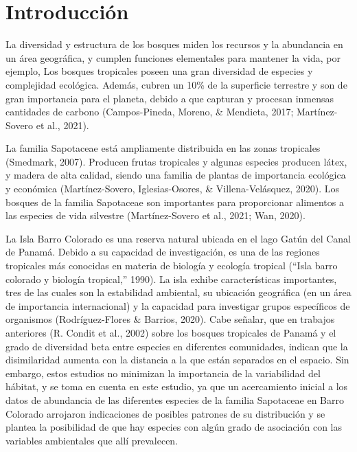 \documentclass[11pt,]{article}
\begin{document}
\vskip 6.5pt


\noindent  \section{Introducción}\label{introducciuxf3n}

La diversidad y estructura de los bosques miden los recursos y la
abundancia en un área geográfica, y cumplen funciones elementales para
mantener la vida, por ejemplo, Los bosques tropicales poseen una gran
diversidad de especies y complejidad ecológica. Además, cubren un 10\%
de la superficie terrestre y son de gran importancia para el planeta,
debido a que capturan y procesan inmensas cantidades de carbono
(Campos-Pineda, Moreno, \& Mendieta, 2017; Martínez-Sovero et al.,
2021).

La familia Sapotaceae está ampliamente distribuida en las zonas
tropicales (Smedmark, 2007). Producen frutas tropicales y algunas
especies producen látex, y madera de alta calidad, siendo una familia de
plantas de importancia ecológica y económica (Martínez-Sovero,
Iglesias-Osores, \& Villena-Velásquez, 2020). Los bosques de la familia
Sapotaceae son importantes para proporcionar alimentos a las especies de
vida silvestre (Martínez-Sovero et al., 2021; Wan, 2020).

La Isla Barro Colorado es una reserva natural ubicada en el lago Gatún
del Canal de Panamá. Debido a su capacidad de investigación, es una de
las regiones tropicales más conocidas en materia de biología y ecología
tropical (``Isla barro colorado y biología tropical,'' 1990). La isla
exhibe características importantes, tres de las cuales son la
estabilidad ambiental, su ubicación geográfica (en un área de
importancia internacional) y la capacidad para investigar grupos
específicos de organismos (Rodríguez-Flores \& Barrios, 2020). Cabe
señalar, que en trabajos anteriores (R. Condit et al., 2002) sobre los
bosques tropicales de Panamá y el grado de diversidad beta entre
especies en diferentes comunidades, indican que la disimilaridad aumenta
con la distancia a la que están separados en el espacio. Sin embargo,
estos estudios no minimizan la importancia de la variabilidad del
hábitat, y se toma en cuenta en este estudio, ya que un acercamiento
inicial a los datos de abundancia de las diferentes especies de la
familia Sapotaceae en Barro Colorado arrojaron indicaciones de posibles
patrones de su distribución y se plantea la posibilidad de que hay
especies con algún grado de asociación con las variables ambientales que
allí prevalecen.
\end{document}
